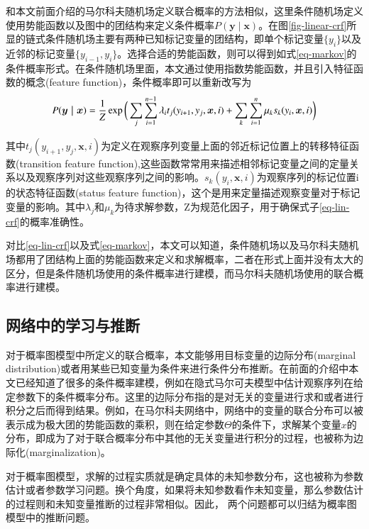 和本文前面介绍的马尔科夫随机场定义联合概率的方法相似，这里条件随机场定义使用势能函数以及图中的团结构来定义条件概率$P(\bm{y \mid x})$。在图\ref{fig-linear-crf}所显的链式条件随机场主要有两种已知标记变量的团结构，即单个标记变量$\{y_i\}$以及近邻的标记变量$\{y_{i-1}, y_i\}$。选择合适的势能函数，则可以得到如式\ref{eq-markov}的条件概率形式。在条件随机场里面，本文通过使用指数势能函数，并且引入特征函数的概念(feature function)，条件概率即可以重新改写为
\begin{equation}
	P(\bm{y \mid x}) = \frac{1}{Z} \exp \bigg(\sum_j \sum_{i = 1}^{n - 1} \lambda_i t_j (y_{i+1}, y_j, \bm{x}, i) + \sum_{k} \sum_{i= 1}^{n} \mu_{k} s_{k}(y_i, \bm{x}, i) \bigg) \\
	\label{eq-lin-crf}
\end{equation}


其中$t_j (y_{i+1}, y_j, \bm{x}, i) $为定义在观察序列变量上面的邻近标记位置上的转移特征函数(transition feature function),这些函数常常用来描述相邻标记变量之间的定量关系以及观察序列对这些观察序列之间的影响。$s_{k}(y_i, \bm{x}, i) $为观察序列的标记位置i的状态特征函数(status feature function)，这个是用来定量描述观察变量对于标记变量的影响。其中$\lambda_j$和$\mu_k$为待求解参数，Z为规范化因子，用于确保式子\ref{eq-lin-crf}的概率准确性。



对比\ref{eq-lin-crf}以及式\ref{eq-markov}，本文可以知道，条件随机场以及马尔科夫随机场都用了团结构上面的势能函数来定义和求解概率，二者在形式上面并没有太大的区分，但是条件随机场使用的条件概率进行建模，而马尔科夫随机场使用的联合概率进行建模。



\subsection{网络中的学习与推断}
对于概率图模型中所定义的联合概率，本文能够用目标变量的边际分布(marginal distribution)或者用某些已知变量为条件来进行条件分布推断。在前面的介绍中本文已经知道了很多的条件概率建模，例如在隐式马尔可夫模型中估计观察序列在给定参数下的条件概率分布。这里的边际分布指的是对无关的变量进行求和或者进行积分之后而得到结果。例如，在马尔科夫网络中，网络中的变量的联合分布可以被表示成为极大团的势能函数的乘积，则在给定参数$\Theta$的条件下，求解某个变量$x$的分布，即成为了对于联合概率分布中其他的无关变量进行积分的过程，也被称为边际化(marginalization)。

对于概率图模型，求解的过程实质就是确定具体的未知参数分布，这也被称为参数估计或者参数学习问题。换个角度，如果将未知参数看作未知变量，那么参数估计的过程则和未知变量推断的过程非常相似。因此， 两个问题都可以归结为概率图模型中的推断问题。


